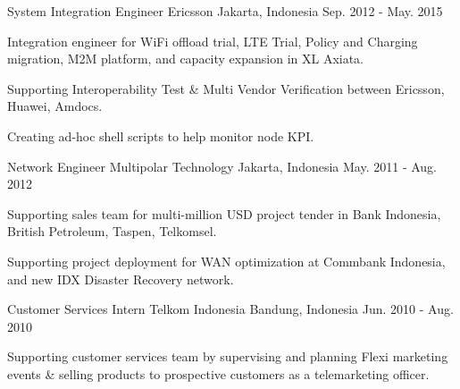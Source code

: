 \begin{cventries}
  \cventry
    {System Integration Engineer} %
    {Ericsson} %
    {Jakarta, Indonesia} %
    {Sep. 2012 - May. 2015} %
    {
      \begin{cvitems} %
        \item {Integration engineer for WiFi offload trial, LTE Trial, Policy and Charging migration, M2M platform, and capacity expansion in XL Axiata.}
        \item {Supporting Interoperability Test \& Multi Vendor Verification between Ericsson, Huawei, Amdocs.}
        \item {Creating ad-hoc shell scripts to help monitor node KPI.}
      \end{cvitems}
    }

  \cventry
    {Network Engineer} %
    {Multipolar Technology} %
    {Jakarta, Indonesia} %
    {May. 2011 - Aug. 2012} %
    {
      \begin{cvitems} %
        \item {Supporting sales team for multi-million USD project tender in Bank Indonesia, British Petroleum, Taspen, Telkomsel.}
        \item {Supporting project deployment for WAN optimization at Commbank Indonesia, and new IDX Disaster Recovery network.}
      \end{cvitems}
    }

  \cventry
    {Customer Services Intern} %
    {Telkom Indonesia} %
    {Bandung, Indonesia} %
    {Jun. 2010 - Aug. 2010} %
    {
      \begin{cvitems} %
        \item {Supporting customer services team by supervising and planning Flexi marketing events \& selling products to prospective customers as a telemarketing officer.}
      \end{cvitems}
    }

\end{cventries}
